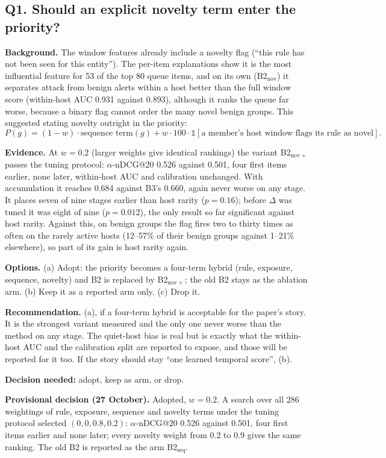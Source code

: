 \documentclass[10.5pt,a4paper]{article}
\newcommand{\rec}[1]{\par\smallskip\noindent\colorbox{gray!12}{\parbox{\dimexpr\linewidth-2\fboxsep}{\textbf{Recommendation.} #1}}\par\smallskip}
\newcommand{\ask}[1]{\par\noindent\textbf{Decision needed:} #1\par\medskip}
\newcommand{\dec}[1]{\par\smallskip\noindent\colorbox{blue!8}{\parbox{\dimexpr\linewidth-2\fboxsep}{\textbf{Provisional decision (27 October).} #1}}\par\medskip}
\newcommand{\sub}[1]{\par\smallskip\noindent\textbf{#1}\quad}
\begin{document}
\subsection*{Q1. Should an explicit novelty term enter the priority?}

\sub{Background.} The window features already include a novelty flag (``this rule has not been seen for this entity''). The per-item explanations show it is the most influential feature for 53 of the top 80 queue items, and on its own (B2$_\mathrm{nov}$) it separates attack from benign alerts within a host better than the full window score (within-host AUC 0.931 against 0.893), although it ranks the queue far worse, because a binary flag cannot order the many novel benign groups. This suggested stating novelty outright in the priority:
\[ P(g) = (1-w)\cdot\text{sequence term}(g) + w\cdot 100\cdot\mathbb{1}[\text{a member's host window flags its rule as novel}]. \]

\sub{Evidence.} At $w = 0.2$ (larger weights give identical rankings) the variant B2$_\mathrm{nov+}$ passes the tuning protocol: $\alpha$-nDCG@20 0.526 against 0.501, four first items earlier, none later, within-host AUC and calibration unchanged. With accumulation it reaches 0.684 against B3's 0.660, again never worse on any stage. It places seven of nine stages earlier than host rarity ($p = 0.16$); before $\Delta$ was tuned it was eight of nine ($p = 0.012$), the only result so far significant against host rarity. Against this, on benign groups the flag fires two to thirty times as often on the rarely active hosts (12--57\% of their benign groups against 1--21\% elsewhere), so part of its gain is host rarity again.

\sub{Options.} (a) Adopt: the priority becomes a four-term hybrid (rule, exposure, sequence, novelty) and B2 is replaced by B2$_\mathrm{nov+}$; the old B2 stays as the ablation arm. (b) Keep it as a reported arm only. (c) Drop it.

\rec{(a), if a four-term hybrid is acceptable for the paper's story. It is the strongest variant measured and the only one never worse than the method on any stage. The quiet-host bias is real but is exactly what the within-host AUC and the calibration split are reported to expose, and those will be reported for it too. If the story should stay ``one learned temporal score'', (b).}
\ask{adopt, keep as arm, or drop.}
\dec{Adopted, $w = 0.2$. A search over all 286 weightings of rule, exposure, sequence and novelty terms under the tuning protocol selected $(0, 0, 0.8, 0.2)$: $\alpha$-nDCG@20 0.526 against 0.501, four first items earlier and none later; every novelty weight from 0.2 to 0.9 gives the same ranking. The old B2 is reported as the arm B2$_\mathrm{seq}$.}
\end{document}

